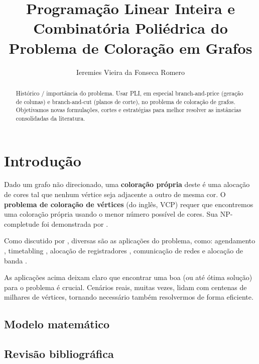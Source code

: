 \documentclass[11pt]{article}
\author{Ieremies Vieira da Fonseca Romero}
\date{}
\title{Programação Linear Inteira e Combinatória Poliédrica do Problema de Coloração em Grafos}
\begin{document}
\maketitle
\begin{abstract}
Histórico / importância do problema.
Usar PLI, em especial branch-and-price (geração de colunas) e branch-and-cut (planos de corte), no problema de coloração de grafos.
Objetivamos novas formulações, cortes e estratégias para melhor resolver as instâncias consolidadas da literatura.
\end{abstract}

\section{Introdução}
\label{sec:org47370ee}
Dado um grafo não direcionado, uma \textbf{coloração própria} deste é uma alocação de cores tal que nenhum vértice seja adjacente a outro de mesma cor.
O \textbf{problema de coloração de vértices} (do inglês, VCP) requer que encontremos uma coloração própria usando o menor número possível de cores.
Sua NP-completude foi demonstrada por \textcite{Garey1979ComputersIntractabilityGuide}.

Como discutido por \textcite{Malaguti2010SurveyVertexColoring}, diversas são as aplicações do problema, como: agendamento \autocite{Leighton1979GraphColoringAlgorithm}, timetabling \autocite{Werra1985introductiontimetabling}, alocação de registradores \autocite{Chow1990prioritybasedcoloring}, comunicação de redes \autocite{Caprara2007PassengerRailwayOptimization} e alocação de banda \autocite{Gamst1986Somelowerbounds}.

As aplicações acima deixam claro que encontrar uma boa (ou até ótima solução) para o problema é crucial.
Cenários reais, muitas vezes, lidam com centenas de milhares de vértices, tornando necessário também resolvermos de forma eficiente.

\subsection{Modelo matemático}
\label{sec:org2960190}

\subsection{Revisão bibliográfica}
\label{sec:orge8ec4f6}
\end{document}
